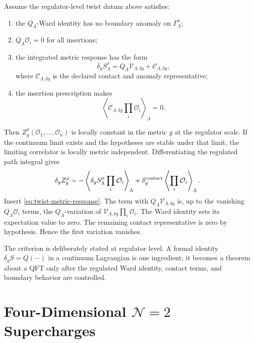 \begin{remark}
\label{rem:twist-metric-independence}
Assume the regulator-level twist datum above satisfies:
\begin{enumerate}[label=(\roman*)]
\item the \(Q_\Lambda\)-Ward identity has no boundary anomaly on
  \(\Gamma_\Lambda^\rho\);
\item \(Q_\Lambda\mathcal O_i=0\) for all insertions;
\item the integrated metric response has the form
\begin{equation}
  \delta_g S_\Lambda^\rho
  =
  Q_\Lambda \mathcal V_{\Lambda,\delta g}
  +
  \mathcal C_{\Lambda,\delta g},
  \label{eq:twist-metric-response}
\end{equation}
where \(\mathcal C_{\Lambda,\delta g}\) is the declared contact and anomaly
representative;
\item the insertion prescription makes
\[
  \left\langle
  \mathcal C_{\Lambda,\delta g}\prod_i\mathcal O_i
  \right\rangle_\Lambda=0 .
\]
\end{enumerate}
Then \(Z_g^\rho(\mathcal O_1,\ldots,\mathcal O_n)\) is locally constant in
the metric \(g\) at the regulator scale.  If the continuum limit exists and
the hypotheses are stable under that limit, the limiting correlator is
locally metric independent.
Differentiating the regulated path integral gives
\[
  \delta_g Z_g^\rho
  =
  -
  \left\langle
  \delta_g S_\Lambda^\rho\prod_i\mathcal O_i
  \right\rangle_\Lambda
  +
  \delta_g^{\rm contact}
  \left\langle\prod_i\mathcal O_i\right\rangle_\Lambda .
\]
Insert \eqref{eq:twist-metric-response}.  The term with
\(Q_\Lambda\mathcal V_{\Lambda,\delta g}\) is, up to the vanishing
\(Q_\Lambda\mathcal O_i\) terms, the \(Q_\Lambda\)-variation of
\(\mathcal V_{\Lambda,\delta g}\prod_i\mathcal O_i\).  The Ward identity
sets its expectation value to zero.  The remaining contact representative is
zero by hypothesis.  Hence the first variation vanishes.

The criterion is deliberately stated at regulator level.  A formal identity
\(\delta_gS=Q(\cdots)\) in a continuum Lagrangian is one ingredient; it
becomes a theorem about a QFT only after the regulated Ward identity,
contact terms, and boundary behavior are controlled.
\end{remark}

\section{\texorpdfstring{Four-Dimensional \(\mathcal N=2\) Supercharges}{Four-Dimensional N=2 Supercharges}}

